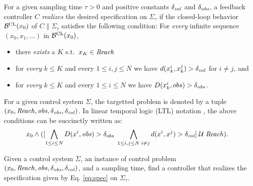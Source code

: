 For a given sampling time $\tau>0$ and positive constants $\delta_{\mathit{col}}$ and $\delta_{\mathit{obs}}$, a feedback controller $C$ \emph{realizes} the desired specification on $\Sigma_\tau$ if the closed-loop behavior $\mathcal{B}^{\mathrm{CL}}(x_0)$ of $C\parallel\Sigma_\tau$ satisfies the following condition: For \emph{every} infinite sequence $(x_0,x_1,\ldots)$ in $\mathcal{B}^{\mathrm{CL}}(x_0)$,
\begin{itemize}
 \item there \emph{exists} a $K$ s.t.\ $x_K\in \mathit{Reach}$ 
 
 \item for \emph{every} $k\leq K$ and every $1\leq i,j \leq N$ we have $d(x^i_k,x^j_k)>\delta_{\mathit{col}}$ for $i\neq j$, and
 
 \item for \emph{every} $k\leq K$ and every $1\leq i\le N$ we have $D(x^i_k,obs)>\delta_{\mathit{obs}}$.
 
 \end{itemize}
 For a given control system $\Sigma$, the targetted problem is denoted by a tuple $(x_0, \mathit{Reach},\mathit{obs}, \delta_{\mathit{obs}},\delta_{\mathit{col}})$. In linear temporal logic (LTL) notation \cite{baier2008principles}, the above conditions can be succinctly written as:
\begin{equation}\label{eq:spec}
	x_0 \wedge ([\bigwedge_{1\leq i\leq N}D(x^i,\mathit{obs})>\delta_{obs}\; \bigwedge_{1\leq i,j\leq N\;i\neq j}  d(x^i,x^j)>\delta_{\mathit{col}}]\; \mathcal{U}\;\mathit{Reach}) .
\end{equation}

\begin{problem}\label{prob:reach-avoid}
	Given a control system $\Sigma$, an instance of control problem $(x_0, \mathit{Reach},\mathit{obs}, \delta_{\mathit{obs}},\delta_{\mathit{col}})$, and a sampling time, find a controller that realizes the specification given by Eq. \eqref{eq:spec} on $\Sigma_\tau$.
\end{problem}

